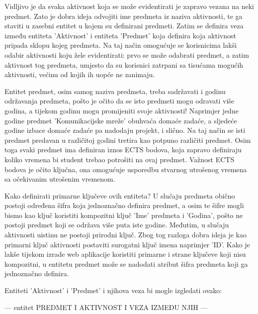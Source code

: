 \documentclass[times, utf8, zavrsni]{fer}
\begin{document}
Vidljivo je da svaka aktivnost koja se može evidentirati je zapravo vezana na neki predmet. Zato je dobra ideja odvojiti ime predmeta iz naziva aktivnosti, te ga staviti u zasebni entitet u kojem su definirani predmeti. Zatim se definira veza između entiteta 'Aktivnost' i entiteta 'Predmet' koja definira koja aktivnost pripada sklopu kojeg predmeta. Na taj način omogućuje se korisnicima lakši odabir aktivnosti koju žele evidentirati: prvo se može odabrati predmet, a zatim aktivnost tog predmeta, umjesto da su korisnici zatrpani sa tisućama mogućih aktivnosti, većinu od kojih ih uopće ne zanimaju.

Entitet predmet, osim samog naziva predmeta, treba sadržavati i godinu održavanja predmeta, pošto je očito da se isto predmeti mogu odravati više godina, a tijekom godinu mogu promijeniti svoje aktivnosti! Naprimjer jedne godine predmet 'Komunikacijske mreže' obuhvaća domaće zadaće, a sljedeće godine izbace domaće zadaće pa nadodaju projekt, i slično. Na taj način se isti predmet predavan u različitoj godini tretira kao potpuno različiti predmet. Osim toga svaki predmet ima definiran iznos ECTS bodova, koja zapravo definiraju koliko vremena bi student trebao potrošiti na ovaj predmet. Važnost ECTS bodova je očito ključna, ona omogućuje usporedbu stvarnog utrošenog vremena sa očekivanim utrošenim vremenom.

Kako definirati primarne ključeve ovih entiteta? U slučaju predmeta obično postoji određena šifra koja jednoznačno definira predmet, a osim te šifre mogli bismo kao ključ koristiti kompozitni ključ 'Ime' predmeta i 'Godina', pošto ne postoji predmet koji se održava više puta iste godine. Međutim, u slučaju aktivnosti uistinu ne postoji prirodni ključ. Zbog tog razloga dobra ideja je kao primarni ključ aktivnosti postaviti surogatni ključ imena naprimjer 'ID'. Kako je lakše tijekom izrade web aplikacije koristiti primarne i strane ključeve koji nisu kompozitni, u entitetu predmet može se nadodati atribut šifra predmeta koji ga jednoznačno definira.

Entiteti 'Aktivnost' i 'Predmet' i njihova veza bi mogle izgledati ovako:

--- entitet PREDMET I AKTIVNOST I VEZA IZMEĐU NJIH ---
\end{document}
